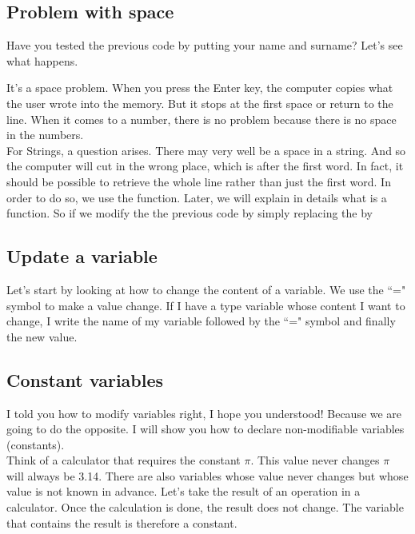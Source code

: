 \documentclass[11pt, a4paper]{article}
\begin{document}
\subsection{Problem with space}
Have you tested the previous code by putting your name and surname?
Let’s see what happens.

It’s a space problem. When you press the Enter key, the computer copies what
the user wrote into the memory. But it stops at the first space or return
to the line. When it comes to a number, there is no problem because there is
no space in the numbers.\\
For Strings, a question arises. There may very well be a space in a string.
And so the computer will cut in the wrong place, which is after the first word.
In fact, it should be possible to retrieve the whole line rather than just the first word.
In order to do so, we use the  function. Later, we will explain in details
what is a function. So if we modify the the previous code by simply replacing the
 by 



\subsection{Update a variable}
Let’s start by looking at how to change the content of a variable.
We use the ``=" symbol to make a value change. If I have a type  variable whose
content I want to change, I write the name of my variable followed by
the ``=" symbol and finally the new value.


\subsection{Constant variables}
I told you how to modify variables right, I hope you understood! Because
we are going to do the opposite. I will show you how to declare non-modifiable variables
(constants).\\
Think of a calculator that requires the constant $\pi$. This value never changes
$\pi$ will always be 3.14.
There are also variables whose value never changes but whose value is
not known in advance. Let’s take the result of an operation in a calculator.
Once the calculation is done, the result does not change. The variable that
contains the result is therefore a constant.
\end{document}
